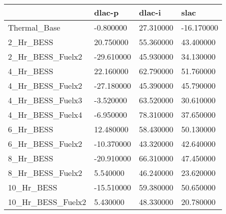 \begin{tabular}{llll}
\toprule
 & dlac-p & dlac-i & slac \\
\midrule
Thermal_Base & -0.800000 & 27.310000 & -16.170000 \\
2_Hr_BESS & 20.750000 & 55.360000 & 43.400000 \\
2_Hr_BESS_Fuelx2 & -29.610000 & 45.930000 & 34.130000 \\
4_Hr_BESS & 22.160000 & 62.790000 & 51.760000 \\
4_Hr_BESS_Fuelx2 & -27.180000 & 45.390000 & 45.790000 \\
4_Hr_BESS_Fuelx3 & -3.520000 & 63.520000 & 30.610000 \\
4_Hr_BESS_Fuelx4 & -6.950000 & 78.310000 & 37.650000 \\
6_Hr_BESS & 12.480000 & 58.430000 & 50.130000 \\
6_Hr_BESS_Fuelx2 & -10.370000 & 43.320000 & 42.640000 \\
8_Hr_BESS & -20.910000 & 66.310000 & 47.450000 \\
8_Hr_BESS_Fuelx2 & 5.540000 & 46.240000 & 23.620000 \\
10_Hr_BESS & -15.510000 & 59.380000 & 50.650000 \\
10_Hr_BESS_Fuelx2 & 5.430000 & 48.330000 & 20.780000 \\
\bottomrule
\end{tabular}
